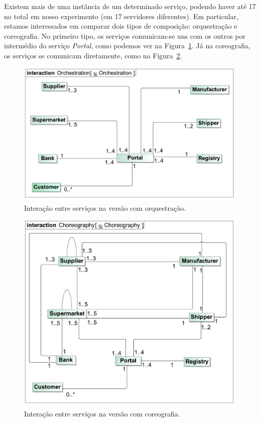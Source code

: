 \documentclass[brazil, a4paper,12pt]{article}
\begin{document}
Existem mais de uma instância de um determinado serviço, podendo haver até 17 no total em nosso experimento (em 17 servidores diferentes). Em particular, estamos interessados em comparar dois tipos de composição: orquestração e coreografia. No primeiro tipo, os serviços comunicam-se uns com os outros por intermédio do serviço \emph{Portal}, como podemos ver na Figura~\ref{fig:orch}. Já na coreografia, os serviços se comunicam diretamente, como na Figura~\ref{fig:chor}. 

\begin{figure}
  \begin{center}
    \includegraphics[width=\textwidth,clip=true,trim=7mm 9mm 8mm 16mm]{../talk/figures/orch}
    \caption{Interação entre serviços na versão com orquestração.}
    \label{fig:orch}
  \end{center}
\end{figure}

\begin{figure}
  \begin{center}
    \includegraphics[width=\textwidth,clip=true,trim=2mm 10mm 5mm 14mm]{../talk/figures/chor}
    \caption{Interação entre serviços na versão com coreografia.}
    \label{fig:chor}
  \end{center}
\end{figure}
\end{document}
